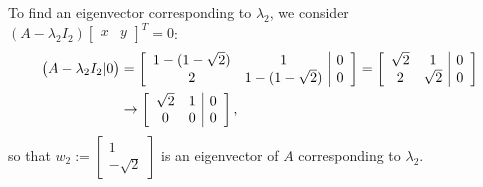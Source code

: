 \documentclass[a4paper]{amsart}
\renewenvironment{solution}{\SolutionInline}{\endSolutionInline}
\begin{document}
\begin{solution}
 To find an eigenvector corresponding to $\lambda_2$, we consider
 $(A - \lambda_2I_2)\left[
 \begin{array}{cc}x & y
 \end{array} \right]^T = 0$:
 \begin{align*}
 \big(A - \lambda_2I_2|0\big) &= \left[ \begin{array}{cc|c} 1 -
 (\textstyle 1-\sqrt{2}) & 1& 0\\ 2 & 1-(\textstyle 1-\sqrt{2}) & 0\end{array} \right] = \left[
 \begin{array}{cc|c} \sqrt{2} & 1 & 0\\ 2 & \sqrt{2} & 0
 \end{array} \right]\\ & \to \left[ \begin{array}{cc|c}
  \sqrt{2} & 1 & 0\\0 & 0 & 0
 \end{array} \right],
 \end{align*}
 so that $w_2 := \left[ \begin{array}{c}1\\ -\sqrt{2}
 \end{array} \right]$ is an eigenvector of $A$ corresponding to
 $\lambda_2$.


\end{solution}
\end{document}
